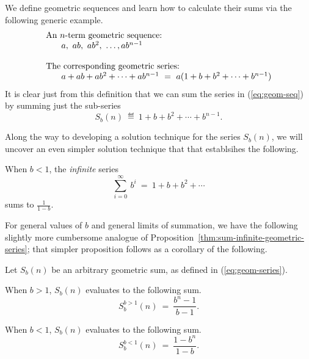 We define geometric sequences and learn how to calculate their sums
via the following generic example.
\begin{equation}
\label{eq:geom-seq}
\begin{array}{l}
\mbox{An $n$-term geometric sequence:} \\
\hspace*{.25in}a, \ ab, \ ab^2, \ \ldots, ab^{n-1} \\
 \\
\mbox{The corresponding geometric series:} \\
\hspace*{.25in}a + ab + ab^2 + \cdots + ab^{n-1} \ = \
 a (1+ b + b^2 + \cdots + b^{n-1})
\end{array}
\end{equation}
It is clear just from this definition that we can sum the series in
(\ref{eq:geom-seq}) by summing just the sub-series
\begin{equation}
\label{eq:geom-series}
S_{b}(n) \ \eqdef \
1+ b + b^2 + \cdots + b^{n-1}.
\end{equation}

Along the way to developing a solution technique for the series
$S_{b}(n)$, we will uncover an even simpler solution
technique that that establsihes the following.

\begin{prop}
\label{thm:sum-infinite-geometric-series}
When $b < 1$,  the {\em infinite} series
\[ \sum_{i=0}^\infty \ b^i \ = \ 1 + b + b^2 + \cdots \]
sums to $\displaystyle \frac{1}{1-b}$.
\end{prop}

\bigskip

For general values of $b$ and general limits of summation, we have the
following slightly more cumbersome analogue of
Proposition~\ref{thm:sum-infinite-geometric-series}; that simpler
proposition follows as a corollary of the following.

\begin{prop}
\label{thm:sum-finite-geometric-series}
Let $S_{b}(n)$ be an arbitrary geometric sum, as defined in
(\ref{eq:geom-series}).

When $b > 1$, $S_{b}(n)$ evaluates to the following sum.
\begin{equation}
\label{eq:geom-sum:b>1}
S^{b>1}_{b}(n) \ = \ \frac{b^{n}- 1}{b - 1}.
\end{equation}

When $b < 1$, $S_{b}(n)$ evaluates to the following sum.
\begin{equation}
\label{eq:geom-sum:b<1}
S^{b<1}_{b}(n) \ = \ \frac{1 - b^n}{1-b}.
\end{equation}
\end{prop}

